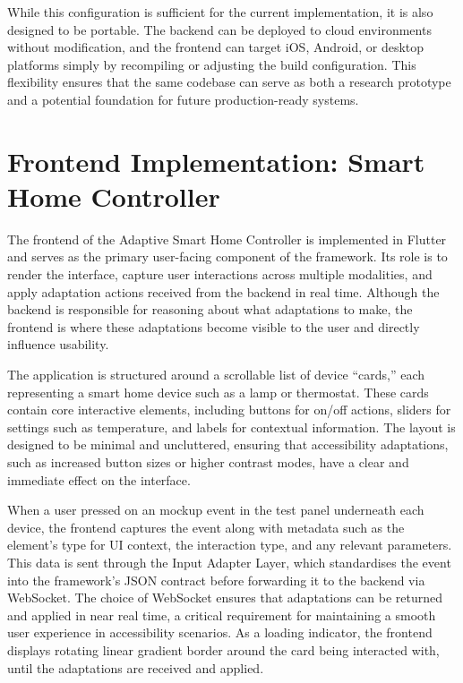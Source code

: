 \documentclass[openany]{book}
\begin{document}
While this configuration is sufficient for the current implementation, it is also designed to be portable. The backend can be deployed to cloud environments without modification, and the frontend can target iOS, Android, or desktop platforms simply by recompiling or adjusting the build configuration. This flexibility ensures that the same codebase can serve as both a research prototype and a potential foundation for future production-ready systems.

\section{Frontend Implementation: Smart Home Controller}
The frontend of the Adaptive Smart Home Controller is implemented in Flutter and serves as the primary user-facing component of the framework. Its role is to render the interface, capture user interactions across multiple modalities, and apply adaptation actions received from the backend in real time. Although the backend is responsible for reasoning about what adaptations to make, the frontend is where these adaptations become visible to the user and directly influence usability.

The application is structured around a scrollable list of device “cards,” each representing a smart home device such as a lamp or thermostat. These cards contain core interactive elements, including buttons for on/off actions, sliders for settings such as temperature, and labels for contextual information. The layout is designed to be minimal and uncluttered, ensuring that accessibility adaptations, such as increased button sizes or higher contrast modes, have a clear and immediate effect on the interface.

When a user pressed on an mockup event in the test panel underneath each device, the frontend captures the event along with metadata such as the element’s type for UI context, the interaction type, and any relevant parameters. This data is sent through the Input Adapter Layer, which standardises the event into the framework’s JSON contract before forwarding it to the backend via WebSocket. The choice of WebSocket ensures that adaptations can be returned and applied in near real time, a critical requirement for maintaining a smooth user experience in accessibility scenarios.
As a loading indicator, the frontend displays rotating linear gradient border around the card being interacted with, until the adaptations are received and applied.
\end{document}
